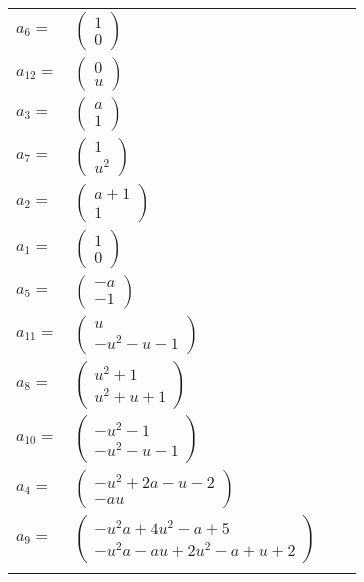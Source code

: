 \documentclass[1p]{elsarticle_modified}
\theoremstyle{definition}
\begin{document}
\begin{tabular}{m{7pt} m{180pt} m{7pt} m{180pt} }
\flushright $a_{6}=$&$\begin{pmatrix}1\\0\end{pmatrix}$ \\
\flushright $a_{12}=$&$\begin{pmatrix}0\\u\end{pmatrix}$ \\
\flushright $a_{3}=$&$\begin{pmatrix}a\\1\end{pmatrix}$ \\
\flushright $a_{7}=$&$\begin{pmatrix}1\\u^2\end{pmatrix}$ \\
\flushright $a_{2}=$&$\begin{pmatrix}a+1\\1\end{pmatrix}$ \\
\flushright $a_{1}=$&$\begin{pmatrix}1\\0\end{pmatrix}$ \\
\flushright $a_{5}=$&$\begin{pmatrix}- a\\-1\end{pmatrix}$ \\
\flushright $a_{11}=$&$\begin{pmatrix}u\\- u^2- u-1\end{pmatrix}$ \\
\flushright $a_{8}=$&$\begin{pmatrix}u^2+1\\u^2+u+1\end{pmatrix}$ \\
\flushright $a_{10}=$&$\begin{pmatrix}- u^2-1\\- u^2- u-1\end{pmatrix}$ \\
\flushright $a_{4}=$&$\begin{pmatrix}- u^2+2 a- u-2\\- a u\end{pmatrix}$ \\
\flushright $a_{9}=$&$\begin{pmatrix}- u^2 a+4 u^2- a+5\\- u^2 a- a u+2 u^2- a+u+2\end{pmatrix}$\\&\end{tabular}
\end{document}
